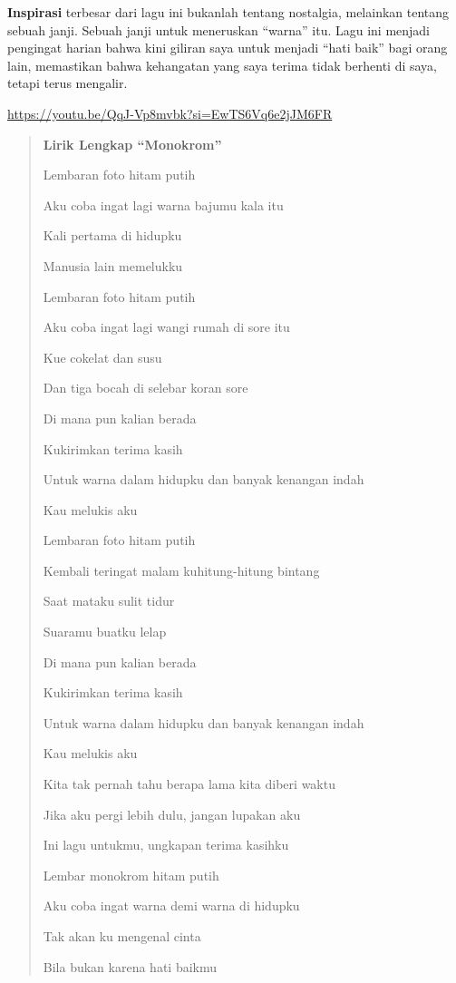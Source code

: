\documentclass[
  letterpaper,
  DIV=11,
  numbers=noendperiod]{scrreprt}
\begin{document}
\textbf{Inspirasi} terbesar dari lagu ini bukanlah tentang nostalgia,
melainkan tentang sebuah janji. Sebuah janji untuk meneruskan ``warna''
itu. Lagu ini menjadi pengingat harian bahwa kini giliran saya untuk
menjadi ``hati baik'' bagi orang lain, memastikan bahwa kehangatan yang
saya terima tidak berhenti di saya, tetapi terus mengalir.

\url{https://youtu.be/QqJ-Vp8mvbk?si=EwTS6Vq6e2jJM6FR}

\begin{quote}
\textbf{Lirik Lengkap ``Monokrom''}

Lembaran foto hitam putih

Aku coba ingat lagi warna bajumu kala itu

Kali pertama di hidupku

Manusia lain memelukku

Lembaran foto hitam putih

Aku coba ingat lagi wangi rumah di sore itu

Kue cokelat dan susu

Dan tiga bocah di selebar koran sore

Di mana pun kalian berada

Kukirimkan terima kasih

Untuk warna dalam hidupku dan banyak kenangan indah

Kau melukis aku

Lembaran foto hitam putih

Kembali teringat malam kuhitung-hitung bintang

Saat mataku sulit tidur

Suaramu buatku lelap

Di mana pun kalian berada

Kukirimkan terima kasih

Untuk warna dalam hidupku dan banyak kenangan indah

Kau melukis aku

Kita tak pernah tahu berapa lama kita diberi waktu

Jika aku pergi lebih dulu, jangan lupakan aku

Ini lagu untukmu, ungkapan terima kasihku

Lembar monokrom hitam putih

Aku coba ingat warna demi warna di hidupku

Tak akan ku mengenal cinta

Bila bukan karena hati baikmu
\end{quote}
\end{document}
